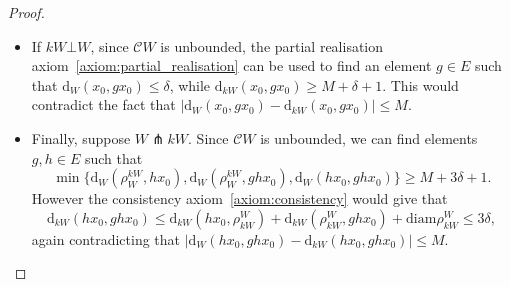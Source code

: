 \documentclass[svgnames]{amsart}
\theoremstyle{plain}
\theoremstyle{definition}
\newcommand{\cal}[1]{\mathcal{#1}}
\newcommand{\C}{\cal C}
\newcommand{\diam}{\mathrm{diam}}
\newcommand{\dist}{\mathrm{d}}
\newcommand{\orth}{\bot}
\newcommand{\trans}{\pitchfork}
\begin{document}
\begin{proof}
\begin{itemize}
        \item If $kW\orth W$, since $\C W$ is unbounded, the partial realisation axiom~\ref{axiom:partial_realisation} can be used to find an element $g\in E$ such that $\dist_W(x_0,gx_0)\le \delta$, while $\dist_{kW}(x_0,gx_0)\ge M+\delta+1$. This would contradict the fact that $|\dist_W(x_0,gx_0)-\dist_{kW}(x_0,gx_0)|\le M$.
        \item Finally, suppose $W\trans kW$. Since $\C W$ is unbounded, we can find elements $g,h\in E$ such that $$\min\{\dist_W(\rho^{kW}_W, hx_0), \dist_W(\rho^{kW}_W, ghx_0), \dist_W(hx_0, ghx_0)\}\ge M+3\delta+1.$$ 
        However the consistency axiom~\ref{axiom:consistency} would give that 
        $$\dist_{kW}(hx_0, ghx_0)\le \dist_{kW}(hx_0, \rho^{W}_{kW})+\dist_{kW}(\rho^{W}_{kW}, ghx_0)+\diam\rho^{W}_{kW}\le 3\delta, $$
        again contradicting that $|\dist_W(hx_0,ghx_0)-\dist_{kW}(hx_0,ghx_0)|\le M$.
    \end{itemize}



\end{proof}
\end{document}

